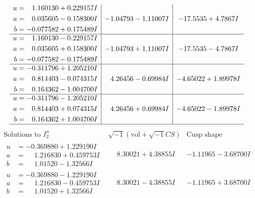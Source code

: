 \documentclass[1p]{elsarticle_modified}
\theoremstyle{definition}
\newcommand{\I}{\sqrt{-1}}
\begin{document}
$$\begin{array}{c|c|c}
\begin{aligned}
u &= \phantom{-}1.160130 + 0.229157 I \\
a &= \phantom{-}0.035605 - 0.158300 I \\
b &= -0.077582 + 0.175489 I\end{aligned}
 & -1.04793 - 1.11007 I & -17.5535 + 4.7867 I \\ \hline\begin{aligned}
u &= \phantom{-}1.160130 - 0.229157 I \\
a &= \phantom{-}0.035605 + 0.158300 I \\
b &= -0.077582 - 0.175489 I\end{aligned}
 & -1.04793 + 1.11007 I & -17.5535 - 4.7867 I \\ \hline\begin{aligned}
u &= -0.311796 + 1.205210 I \\
a &= \phantom{-}0.814403 - 0.074315 I \\
b &= \phantom{-}0.164362 - 1.004700 I\end{aligned}
 & \phantom{-}4.26456 - 0.69984 I & -4.65022 + 1.89978 I \\ \hline\begin{aligned}
u &= -0.311796 - 1.205210 I \\
a &= \phantom{-}0.814403 + 0.074315 I \\
b &= \phantom{-}0.164362 + 1.004700 I\end{aligned}
 & \phantom{-}4.26456 + 0.69984 I & -4.65022 - 1.89978 I\\
 \hline 
 \end{array}$$\newpage$$\begin{array}{c|c|c}  
\text{Solutions to }I^u_{2}& \I (\text{vol} + \sqrt{-1}CS) & \text{Cusp shape}\\
 \hline 
\begin{aligned}
u &= -0.369880 + 1.229190 I \\
a &= \phantom{-}1.216830 + 0.459753 I \\
b &= \phantom{-}1.01520 - 1.32566 I\end{aligned}
 & \phantom{-}8.30021 + 4.38855 I & -1.11965 - 3.68700 I \\ \hline\begin{aligned}
u &= -0.369880 - 1.229190 I \\
a &= \phantom{-}1.216830 - 0.459753 I \\
b &= \phantom{-}1.01520 + 1.32566 I\end{aligned}
 & \phantom{-}8.30021 - 4.38855 I & -1.11965 + 3.68700 I \\ \hline\begin{aligned}

\end{aligned}
\end{array}$$
\end{document}
